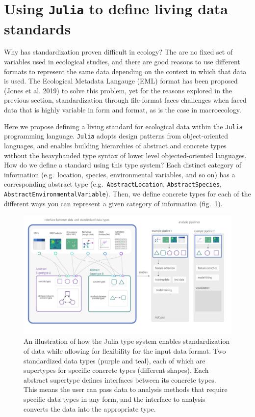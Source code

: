 \documentclass[10pt,oneside]{article}
\makeatletter
\def\maxwidth{\ifdim\Gin@nat@width>\linewidth\linewidth
\else\Gin@nat@width\fi}
\let\Oldincludegraphics\includegraphics
\renewcommand{\includegraphics}[1]{\Oldincludegraphics[width=\maxwidth]{#1}}
\makeatother
\begin{document}
\hypertarget{using-julia-to-define-living-data-standards}{%
\section{\texorpdfstring{Using \texttt{Julia} to define living data
standards}{Using Julia to define living data standards}}\label{using-julia-to-define-living-data-standards}}

Why has standardization proven difficult in ecology? The are no fixed
set of variables used in ecological studies, and there are good reasons
to use different formats to represent the same data depending on the
context in which that data is used. The Ecological Metadata Langauge
(EML) format has been proposed (Jones et al. 2019) to solve this
problem, yet for the reasons explored in the previous section,
standardization through file-format faces challenges when faced data
that is highly variable in form and format, as is the case in
macroecology.

Here we propose defining a living standard for ecological data within
the \texttt{Julia} programming language. \texttt{Julia} adopts design
patterns from object-oriented languages, and enables building
hierarchies of abstract and concrete types without the heavyhanded type
syntax of lower level objected-oriented languages. How do we define a
standard using this type system? Each distinct category of information
(e.g.~location, species, environmental variables, and so on) has a
corresponding abstract type (e.g.~\texttt{AbstractLocation},
\texttt{AbstractSpecies}, \texttt{AbstractEnvironmentalVariable}). Then,
we define concrete types for each of the different ways you can
represent a given category of information (fig.~\ref{fig:concept}).

\begin{figure}
\hypertarget{fig:concept}{%
\centering
\includegraphics{./figures/concept.png}
\caption{An illustration of how the Julia type system enables
standardization of data while allowing for flexibility for the input
data format. Two standardized data types (purple and teal), each of
which are supertypes for specific concrete types (different shapes).
Each abstract supertype defines interfaces between its concrete types.
This means the user can pass data to analysis methods that require
specific data types in any form, and the interface to analysis converts
the data into the appropriate type.}\label{fig:concept}
}
\end{figure}
\end{document}
